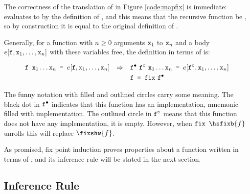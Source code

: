 The correctness of the translation of  in Figure
\ref{code:mapfix} is immediate:  evaluates to
 by the definition of , and this means
that the recursive function  be , so by
construction it is equal to the original definition of .

Generally, for a function  with $n \geq 0$ arguments $\texttt{x}_1$
to $\texttt{x}_n$ and a body $e[\texttt{f},\texttt{x}_1,\ldots,\texttt{x}_n]$ with
these variables free, the definition in terms of  is:

\begin{align*}
& \texttt{f } \texttt{x}_1 \ldots \texttt{x}_n \texttt{ = } e[\texttt{f},\texttt{x}_1,\ldots,\texttt{x}_n] & \Rightarrow &&& \texttt{f}^{\bullet} \,\, \texttt{f}^{\circ} \,\, \texttt{x}_1 \ldots \texttt{x}_n \texttt{ = } e[\texttt{f}^{\circ},\texttt{x}_1,\ldots,\texttt{x}_n] \\
&                                                                     &             &&& \texttt{f = fix} \,\, \texttt{f}^{\bullet}
\end{align*}

The funny notation with filled and outlined circles carry some
meaning. The black dot in $\texttt{f}^{\bullet}$ indicates that this function
has an implementation, mnemonic filled with implementation. The
outlined circle in $\texttt{f}^{\circ}$ means that this function does not have
any implementation, it is empty. However, when $\hs{fix }\hsfixb{f}$
unrolls this will replace $\fixshw{f}$.

\begin{comment}
This translation needs to be carried out with some care, since for $f
\, \overline{x} = e(\overline{x},f)$, it is also possible that $f$ is
called in bodies of other functions. These are of two kinds: either
this function is also called from $f$, making it recursive, or another
function which is not called from $f$, but makes use of $f$
anyway. The first example, with a recursive call, the body needs to be
edited so $f$ becomes translated (to $\bot$, $\unfix{f}$ or
$\tofix{f}$), and the second case should use the original $f$. The
transitive closure of the call graph is calculated, and every
appropriate calls of $f$ are replaced.
\end{comment}

As promised, fix point induction proves properties about a function written in terms
of , and its inference rule will be stated in the next section.

\subsection{Inference Rule}

